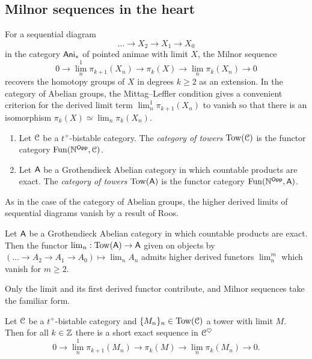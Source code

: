 \subsection{Milnor sequences in the heart}\label{subsec: Milnor sequences in the heart}
For a sequential diagram 
$$\dots\to X_{2}\to X_{1}\to X_{0}$$
in the category $\mathsf{Ani}_{*}$ of pointed animae with limit $X$, the Milnor sequence 
$$0\to \lim_{n}^{1}\pi_{k+1}(X_{n})\to\pi_{k}(X)\to\lim_{n}\pi_{k}(X_{n})\to0$$
recovers the homotopy groups of $X$ in degrees $k\geq 2$ as an extension. In the category of Abelian groups, the Mittag--Leffler condition gives a convenient criterion for the derived limit term $\lim^{1}_{n}\pi_{k+1}(X_{n})$ to vanish so that there is an isomorphism $\pi_{k}(X)\simeq\lim_{n}\pi_{k}(X_{n})$. 
\begin{definition}\label{def: tower}
    \begin{enumerate}
        \item Let $\EuScript{C}$ be a $t^{+}$-bistable category. The \emph{category of towers} $\mathrm{Tow}(\EuScript{C})$ is the functor category $\mathrm{Fun}(\mathbb{N}^{\mathsf{Opp}},\EuScript{C})$.
        \item Let $\mathsf{A}$ be a Grothendieck Abelian category in which countable products are exact. The \emph{category of towers} $\mathrm{Tow}(\mathsf{A})$ is the functor category $\mathrm{Fun}(\mathbb{N}^{\mathsf{Opp}},\mathsf{A})$.
    \end{enumerate} 
\end{definition}
As in the case of the category of Abelian groups, the higher derived limits of sequential diagrams vanish by a result of Roos.  
\begin{lemma}\label{lem: vanishing of higher derived limits}
    Let $\mathsf{A}$ be a Grothendieck Abelian category in which countable products are exact. Then the functor $\lim_{n}:\mathrm{Tow}(\mathsf{A})\to\mathsf{A}$ given on objects by $(\dots\to A_{2}\to A_{1}\to A_{0})\mapsto\lim_{n}A_{n}$ admits higher derived functors $\lim_{n}^{m}$ which vanish for $m\geq 2$. 
\end{lemma}
Only the limit and its first derived functor contribute, and Milnor sequences take the familiar form.
\begin{proposition}\label{prop: Milnor sequence in t-plus bistable}
    Let $\EuScript{C}$ be a $t^{+}$-bistable category and $\{M_{n}\}_{n}\in\mathrm{Tow}(\EuScript{C})$ a tower with limit $M$. Then for all $k\in\mathbb{Z}$ there is a short exact sequence in $\EuScript{C}^{\heartsuit}$
    \begin{equation}\label{eqn: t plus bistable Milnor sequence}
        0\to\lim_{n}^{1}\pi_{k+1}(M_{n})\to\pi_{k}(M)\to\lim_{n}\pi_{k}(M_{n})\to0.
    \end{equation}
\end{proposition}
